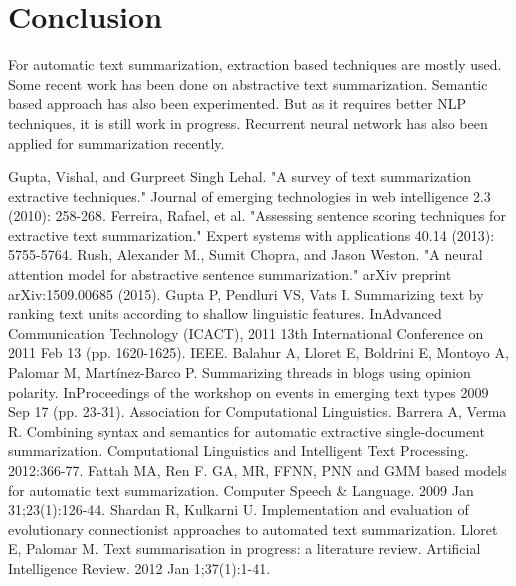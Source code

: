 \documentclass[conference]{IEEEtran}
\begin{document}
\section{Conclusion}
For automatic text summarization, extraction based techniques are mostly used. Some recent work has been done on abstractive text summarization. Semantic based approach has also been experimented. But as it requires better NLP techniques, it is still work in progress. Recurrent neural network has also been applied for summarization recently.  
\begin{thebibliography}{1}
Gupta, Vishal, and Gurpreet Singh Lehal. "A survey of text summarization extractive techniques." Journal of emerging technologies in web intelligence 2.3 (2010): 258-268.
Ferreira, Rafael, et al. "Assessing sentence scoring techniques for extractive text summarization." Expert systems with applications 40.14 (2013): 5755-5764.
Rush, Alexander M., Sumit Chopra, and Jason Weston. "A neural attention model for abstractive sentence summarization." arXiv preprint arXiv:1509.00685 (2015).
Gupta P, Pendluri VS, Vats I. Summarizing text by ranking text units according to shallow linguistic features. InAdvanced Communication Technology (ICACT), 2011 13th International Conference on 2011 Feb 13 (pp. 1620-1625). IEEE.
Balahur A, Lloret E, Boldrini E, Montoyo A, Palomar M, Martínez-Barco P. Summarizing threads in blogs using opinion polarity. InProceedings of the workshop on events in emerging text types 2009 Sep 17 (pp. 23-31). Association for Computational Linguistics.
Barrera A, Verma R. Combining syntax and semantics for automatic extractive single-document summarization. Computational Linguistics and Intelligent Text Processing. 2012:366-77.
Fattah MA, Ren F. GA, MR, FFNN, PNN and GMM based models for automatic text summarization. Computer Speech \& Language. 2009 Jan 31;23(1):126-44.
Shardan R, Kulkarni U. Implementation and evaluation of evolutionary connectionist approaches to automated text summarization.
Lloret E, Palomar M. Text summarisation in progress: a literature review. Artificial Intelligence Review. 2012 Jan 1;37(1):1-41.
\end{thebibliography}
\end{document}

